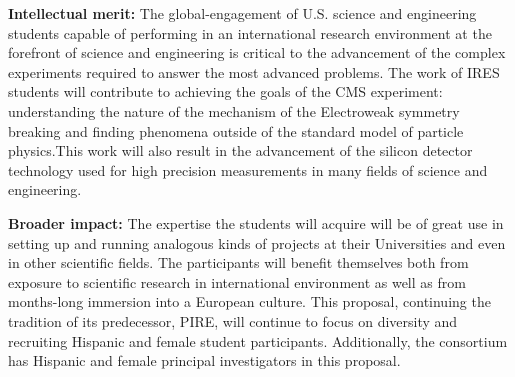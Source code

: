 \documentclass[12pt]{article}
\begin{document}
{\bf Intellectual merit:} The global-engagement of U.S. science and
engineering students capable of performing in an international
research environment at the forefront of science and engineering is
critical to the advancement of the complex experiments required to
answer the most advanced problems. The work of IRES students will
contribute to achieving the goals of the CMS experiment: understanding
the nature of the mechanism of the Electroweak symmetry breaking and
finding phenomena outside of the standard model of particle
physics.This work will also result in the advancement of the silicon
detector technology used for high precision measurements in many
fields of science and engineering.

{\bf Broader impact:}
The expertise the students will acquire will be of great use in
setting up and running analogous kinds of projects at their
Universities and even in other scientific fields. The participants
will benefit themselves both from exposure to scientific research in
international environment as well as from months-long immersion into
a European culture. This proposal, continuing the tradition of its
predecessor, PIRE, will continue to focus on diversity and recruiting
Hispanic and female student participants. Additionally, the consortium
has Hispanic and female principal investigators in this proposal.
\end{document}
